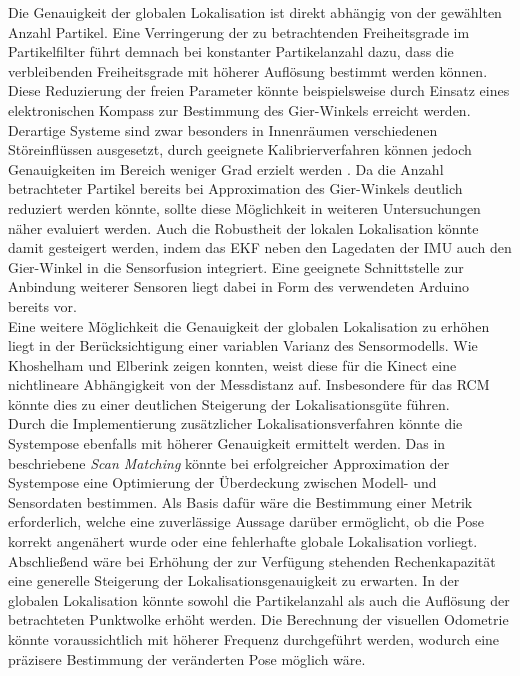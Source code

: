 Die Genauigkeit der globalen Lokalisation ist direkt abhängig von der gewählten Anzahl Partikel. Eine Verringerung der zu betrachtenden Freiheitsgrade im Partikelfilter führt demnach bei konstanter Partikelanzahl dazu, dass die verbleibenden Freiheitsgrade mit höherer Auflösung bestimmt werden können. Diese Reduzierung der freien Parameter könnte beispielsweise durch Einsatz eines elektronischen Kompass zur Bestimmung des Gier-Winkels erreicht werden. Derartige Systeme sind zwar besonders in Innenräumen verschiedenen Störeinflüssen ausgesetzt, durch geeignete Kalibrierverfahren können jedoch Genauigkeiten im Bereich weniger Grad erzielt werden \cite{Li2011}. Da die Anzahl betrachteter Partikel bereits bei Approximation des Gier-Winkels deutlich reduziert werden könnte, sollte diese Möglichkeit in weiteren Untersuchungen näher evaluiert werden. Auch die Robustheit der lokalen Lokalisation könnte damit gesteigert werden, indem das EKF neben den Lagedaten der IMU auch den Gier-Winkel in die Sensorfusion integriert. Eine geeignete Schnittstelle zur Anbindung weiterer Sensoren liegt dabei in Form des verwendeten Arduino bereits vor.\\

Eine weitere Möglichkeit die Genauigkeit der globalen Lokalisation zu erhöhen liegt in der Berücksichtigung einer variablen Varianz des Sensormodells. Wie Khoshelham und Elberink \cite{Khoshelham2012} zeigen konnten, weist diese für die Kinect eine nichtlineare Abhängigkeit von der Messdistanz auf. Insbesondere für das RCM könnte dies zu einer deutlichen Steigerung der Lokalisationsgüte führen.\\

Durch die Implementierung zusätzlicher Lokalisationsverfahren könnte die Systempose ebenfalls mit höherer Genauigkeit ermittelt werden. Das in  beschriebene \textit{Scan Matching} könnte bei erfolgreicher Approximation der Systempose eine Optimierung der Überdeckung zwischen Modell- und Sensordaten bestimmen. Als Basis dafür wäre die Bestimmung einer Metrik erforderlich, welche eine zuverlässige Aussage darüber ermöglicht, ob die Pose korrekt angenähert wurde oder eine fehlerhafte globale Lokalisation vorliegt.\\

Abschließend wäre bei Erhöhung der zur Verfügung stehenden Rechenkapazität eine generelle Steigerung der Lokalisationsgenauigkeit zu erwarten. In der globalen Lokalisation könnte sowohl die Partikelanzahl als auch die Auflösung der betrachteten Punktwolke erhöht werden. Die Berechnung der visuellen Odometrie könnte voraussichtlich mit höherer Frequenz durchgeführt werden, wodurch eine präzisere Bestimmung der veränderten Pose möglich wäre.\\

